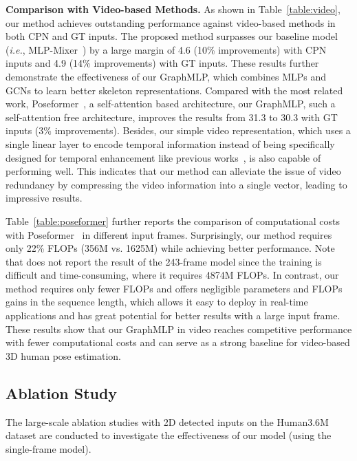 \documentclass[lettersize,journal]{IEEEtran}
\begin{document}
\noindent \textbf{Comparison with Video-based Methods.}
As shown in Table~\ref{table:video}, our method achieves outstanding performance against video-based methods in both CPN and GT inputs. 
The proposed method surpasses our baseline model (\emph{i.e.}, MLP-Mixer~\cite{mlpmixer}) by a large margin of 4.6  (10\% improvements) with CPN inputs and 4.9  (14\% improvements) with GT inputs.  
These results further demonstrate the effectiveness of our GraphMLP, which combines MLPs and GCNs to learn better skeleton representations. 
Compared with the most related work, Poseformer~\cite{poseformer}, a self-attention based architecture, our GraphMLP, such a self-attention free architecture, improves the results from 31.3  to 30.3  with GT inputs (3\% improvements). 
Besides, our simple video representation, which uses a single linear layer to encode temporal information instead of being specifically designed for temporal enhancement like previous works~\cite{videopose,chen2021anatomy,poseformer}, is also capable of performing well. 
This indicates that our method can alleviate the issue of video redundancy by compressing the video information into a single vector, leading to impressive results. 

Table~\ref{table:poseformer} further reports the comparison of computational costs with Poseformer~\cite{poseformer} in different input frames. 
Surprisingly, our method requires only 22\% FLOPs (356M vs. 1625M) while achieving better performance. 
Note that \cite{poseformer} does not report the result of the 243-frame model since the training is difficult and time-consuming, where it requires 4874M FLOPs. 
In contrast, our method requires only  fewer FLOPs and offers negligible parameters and FLOPs gains in the sequence length, which allows it easy to deploy in real-time applications and has great potential for better results with a large input frame. 
These results show that our GraphMLP in video reaches competitive performance with fewer computational costs and can serve as a strong baseline for video-based 3D human pose estimation. 

\subsection{Ablation Study}
The large-scale ablation studies with 2D detected inputs on the Human3.6M dataset are conducted to investigate the effectiveness of our model (using the single-frame model). 
\end{document}
